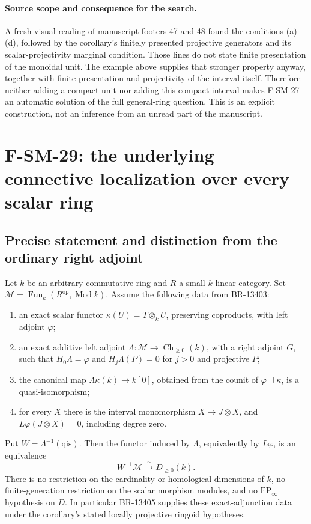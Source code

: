 \documentclass[11pt,a4paper]{article}
\theoremstyle{definition}\newtheorem{definition}[theorem]{Definition}
\theoremstyle{remark}\newtheorem{remark}[theorem]{Remark}
\begin{document}
\paragraph{Source scope and consequence for the search.}
A fresh visual reading of manuscript footers 47 and 48 found the
conditions (a)--(d), followed by the corollary's finitely presented
projective generators and its scalar-projectivity marginal condition.
Those lines do not state finite presentation of the monoidal unit.
The example above supplies that stronger property anyway, together
with finite presentation and projectivity of the interval itself.
Therefore neither adding a compact unit nor adding this compact
interval makes F-SM-27 an automatic solution of the full general-ring
question.  This is an explicit construction, not an inference from
an unread part of the manuscript.



\section{F-SM-29: the underlying connective localization over every scalar ring}

\subsection{Precise statement and distinction from the ordinary right adjoint}
Let \(k\) be an arbitrary commutative ring and \(R\) a small
\(k\)-linear category.  Set
\(\mathcal M=\operatorname{Fun}_k(R^{\mathrm{op}},\operatorname{Mod}k)\).
Assume the following data from BR-13403:
\begin{enumerate}
\item an exact scalar functor \(\kappa(U)=T\otimes_kU\), preserving
coproducts, with left adjoint \(\varphi\);
\item an exact additive left adjoint
\(\Lambda:\mathcal M\to\operatorname{Ch}_{\ge0}(k)\), with a right
adjoint \(G\), such that \(H_0\Lambda=\varphi\) and
\(H_j\Lambda(P)=0\) for \(j>0\) and projective \(P\);
\item the canonical map
\(\Lambda\kappa(k)\to k[0]\), obtained from the counit of
\(\varphi\dashv\kappa\), is a quasi-isomorphism;
\item for every \(X\) there is the interval monomorphism
\(X\to J\otimes X\), and
\(L\varphi(J\otimes X)=0\), including degree zero.
\end{enumerate}
Put \(W=\Lambda^{-1}(\mathrm{qis})\).  Then the functor induced by
\(\Lambda\), equivalently by \(L\varphi\), is an equivalence
\[
 W^{-1}\mathcal M\xrightarrow{\ \sim\ }D_{\ge0}(k).
 \tag{SM29.1}
\]
There is no restriction on the cardinality or homological dimensions
of \(k\), no finite-generation restriction on the scalar morphism
modules, and no \(\mathrm{FP}_\infty\) hypothesis on \(D\).
In particular BR-13405 supplies these exact-adjunction data under
the corollary's stated locally projective ringoid hypotheses.
\end{document}
